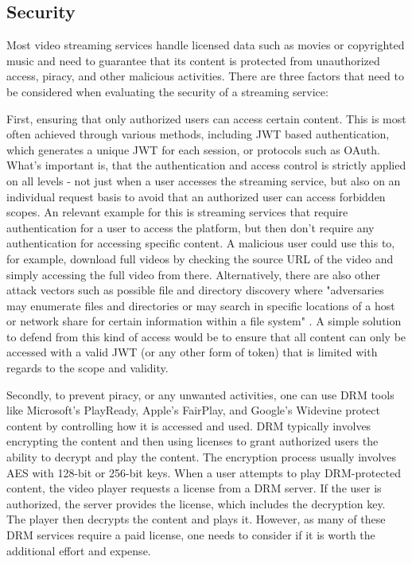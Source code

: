 \subsection{Security}

Most video streaming services handle licensed data such as movies or copyrighted music and need to guarantee that its content is protected from unauthorized access, piracy, and other malicious activities.
There are three factors that need to be considered when evaluating the security of a streaming service: 

First, ensuring that only authorized users can access certain content. This is most often achieved through various methods, including \ac{JWT} based authentication, which generates a unique \ac{JWT} for each session, or protocols such as OAuth. What's important is, that the authentication and access control is strictly applied on all levels - not just when a user accesses the streaming service, but also on an individual request basis to avoid that an authorized user can access forbidden scopes. An relevant example for this is streaming services that require authentication for a user to access the platform, but then don't require any authentication for accessing specific content. A malicious user could use this to, for example, download full videos by checking the source URL of the video and simply accessing the full video from there. Alternatively, there are also other attack vectors such as possible file and directory discovery where "adversaries may enumerate files and directories or may search in specific locations of a host or network share for certain information within a file system" \cite{mitre}. A simple solution to defend from this kind of access would be to ensure that all content can only be accessed with a valid \ac{JWT} (or any other form of token) that is limited with regards to the scope and validity.

Secondly, to prevent piracy, or any unwanted activities, one can use \ac{DRM} tools like Microsoft's PlayReady, Apple's FairPlay, and Google's Widevine protect content by controlling how it is accessed and used. \ac{DRM} typically involves encrypting the content and then using licenses to grant authorized users the ability to decrypt and play the content. The encryption process usually involves \ac{AES} with 128-bit or 256-bit keys. When a user attempts to play \ac{DRM}-protected content, the video player requests a license from a \ac{DRM} server. If the user is authorized, the server provides the license, which includes the decryption key. The player then decrypts the content and plays it\cite{aes_drm}. However, as many of these \ac{DRM} services require a paid license, one needs to consider if it is worth the additional effort and expense.

